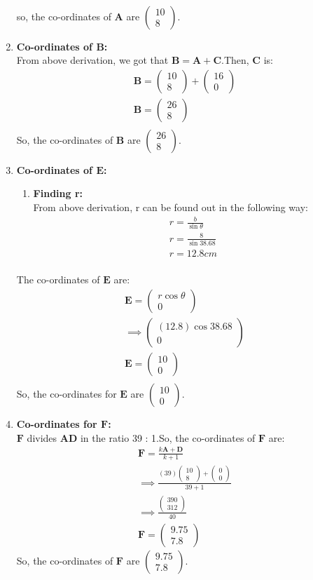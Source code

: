 \documentclass{article}
\newcommand{\myvec}[1]{\ensuremath{\begin{pmatrix}#1\end{pmatrix}}}
\let\vec\mathbf
\begin{document}
\begin{enumerate}
\begin{align}
			\end{align}
so, the co-ordinates of $\vec{A}$ are $\myvec{10\\8}$.
\item \textbf{Co-ordinates of $\vec{B}$:}\\
	From above derivation, we got that $\vec{B} = \vec{A} + \vec{C}$.Then, $\vec{C}$ is:\\
		\begin{align}
			\vec{B} = \myvec{10\\8} + \myvec{16\\0}\\
			\vec{B} = \myvec{26\\8}\\
		\end{align}
So, the co-ordinates of $\vec{B}$ are $\myvec{26\\8}$.
\item \textbf{Co-ordinates of $\vec{E}$:}\\
	\begin{enumerate}
		\item \textbf{Finding r:}\\
From above derivation, r can be found out in the following way:\\
			\begin{align}
				r = \frac{b}{\sin{\theta}}\\
				r = \frac{8}{\sin{38.68}}\\
				r = 12.8cm\\
			\end{align}
	\end{enumerate}
		The co-ordinates of $\vec{E}$ are:
		\begin{align}
			\vec{E} = \myvec{r\cos{\theta}\\0}\\
			\implies \myvec{(12.8)\cos{38.68}\\0}\\
			\vec{E} = \myvec{10\\0}\\
		\end{align}
So, the co-ordinates for $\vec{E}$ are $\myvec{10\\0}$.
\item \textbf{Co-ordinates for $\vec{F}$:}\\
	$\vec{F}$ divides $\vec{AD}$ in the ratio 39 : 1.So, the co-ordinates of $\vec{F}$ are:
		\begin{align}
			\vec{F} = \frac{k\vec{A} + \vec{D}}{k + 1}\\
			\implies \frac{(39)\myvec{10\\8} + \myvec{0\\0}}{39 + 1}\\
			\implies \frac{\myvec{390\\312}}{40}\\
			\vec{F} = \myvec{9.75\\7.8}
		\end{align}
So, the co-ordinates of $\vec{F}$ are $\myvec{9.75\\7.8}$.
\end{enumerate}
\end{document}
